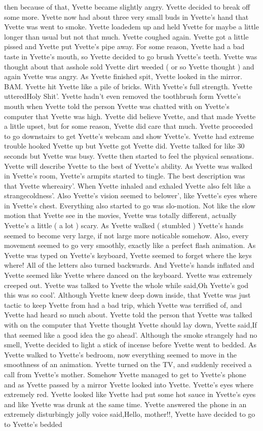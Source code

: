 \documentclass[12pt]{book}
\begin{document}
then because of that, Yvette became slightly angry. Yvette decided to break off some more. Yvette now had about three very small buds in Yvette's hand that Yvette was went to smoke. Yvette loadedem up and held Yvette for maybe a little longer than usual but not that much. Yvette coughed again. Yvette got a little pissed and Yvette put Yvette's pipe away. For some reason, Yvette had a bad taste in Yvette's mouth, so Yvette decided to go brush Yvette's teeth. Yvette was thought about that asshole sold Yvette dirt weeded ( or so Yvette thought ) and again Yvette was angry. As Yvette finished spit, Yvette looked in the mirror. BAM. Yvette hit Yvette like a pile of bricks. With Yvette's full strength. Yvette utteredHoly Shit'. Yvette hadn't even removed the toothbrush form Yvette's mouth when Yvette told the person Yvette was chatted with on Yvette's computer that Yvette was high. Yvette did believe Yvette, and that made Yvette a little upset, but for some reason, Yvette did care that much. Yvette proceeded to go downstairs to get Yvette's webcam and show Yvette's. Yvette had extreme trouble hooked Yvette up but Yvette got Yvette did. Yvette talked for like 30 seconds but Yvette was busy. Yvette then started to feel the physical sensations. Yvette will describe Yvette to the best of Yvette's ability. As Yvette was walked in Yvette's room, Yvette's armpits started to tingle. The best description was that Yvette whereairy'. When Yvette inhaled and exhaled Yvette also felt like a strangecoldness'. Also Yvette's vision seemed to belower', like Yvette's eyes where in Yvette's chest. Everything also started to go was slo-motion. Not like the slow motion that Yvette see in the movies, Yvette was totally different, actually Yvette's a little ( a lot ) scary. As Yvette walked ( stumbled ) Yvette's hands seemed to become very large, if not large more noticable somehow. Also, every movement seemed to go very smoothly, exactly like a perfect flash animation. As Yvette was typed on Yvette's keyboard, Yvette seemed to forget where the keys where! All of the letters also turned backwards. And Yvette's hands inflated and Yvette seemed like Yvette where danced on the keyboard. Yvette was extremely creeped out. Yvette was talked to Yvette the whole while said,Oh Yvette's god this was so cool'. Although Yvette knew deep down inside, that Yvette was just tactic to keep Yvette from had a bad trip, which Yvette was terrified of, and Yvette had heard so much about. Yvette told the person that Yvette was talked with on the computer that Yvette thought Yvette should lay down, Yvette said,If that seemed like a good idea the go ahead'. Although the smoke strangely had no smell, Yvette decided to light a stick of incense before Yvette went to bedded. As Yvette walked to Yvette's bedroom, now everything seemed to move in the smoothness of an animation. Yvette turned on the TV, and suddenly received a call from Yvette's mother. Somehow Yvette managed to get to Yvette's phone and as Yvette passed by a mirror Yvette looked into Yvette. Yvette's eyes where extremely red. Yvette looked like Yvette had put some hot sauce in Yvette's eyes and like Yvette was drunk at the same time. Yvette answered the phone in an extremely disturbingly jolly voice said,Hello, mother!!, Yvette have decided to go to Yvette's bedded 
\end{document}

